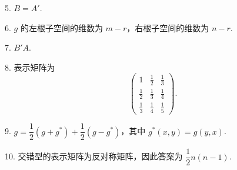 \documentclass[UTF8,12pt,a4paper,fontset=fandol]{ctexart}
\begin{document}
5. $B=A'$.

6. $g$ 的左根子空间的维数为 $m-r$，右根子空间的维数为 $n-r$.

7. $B'A$.

8. 表示矩阵为
\[
\left(\begin{array}{ccc}
1 & \frac12 & \frac13\\
\frac12 & \frac13 & \frac14\\
\frac13 & \frac14 & \frac15
\end{array}\right).
\]

9. $g=\dfrac12(g+g^*)+\dfrac12(g-g^*)$，其中 $g^*(x,y)=g(y,x)$.

10. 交错型的表示矩阵为反对称矩阵，因此答案为 $\dfrac12 n(n-1)$.
\end{document}
